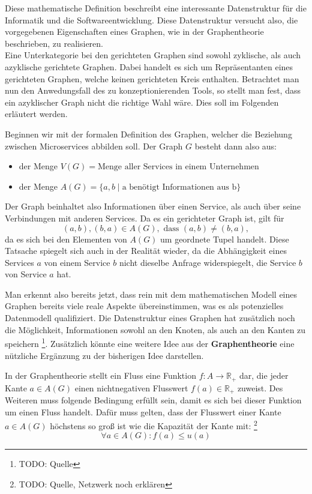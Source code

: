 Diese mathematische Definition beschreibt eine interessante Datenstruktur für die Informatik und die Softwareentwicklung. Diese Datenstruktur versucht also, die vorgegebenen Eigenschaften eines Graphen, wie in der Graphentheorie beschrieben, zu realisieren. \\
Eine Unterkategorie bei den gerichteten Graphen sind sowohl zyklische, als auch azyklische gerichtete Graphen. Dabei handelt es sich um Repräsentanten eines gerichteten Graphen, welche keinen gerichteten Kreis enthalten. Betrachtet man nun den Anwedungsfall des zu konzeptionierenden Tools, so stellt man fest, dass ein azyklischer Graph nicht die richtige Wahl wäre. Dies soll im Folgenden erläutert werden.

\begin{example}
	Beginnen wir mit der formalen Definition des Graphen, welcher die Beziehung zwischen Microservices abbilden soll. Der Graph $G$ besteht dann also aus: 
	\begin{itemize}
		\item der Menge $V(G)=\text{Menge aller Services in einem Unternehmen}$
		\item der Menge $A(G)=\{a,b \mid \text{a benötigt Informationen aus b}\}$
	\end{itemize}
	Der Graph beinhaltet also Informationen über einen Service, als auch über seine Verbindungen mit anderen Services. Da es ein gerichteter Graph ist, gilt für $$(a,b), (b,a) \in A(G),\text{ dass }(a,b) \neq (b,a),$$ da es sich bei den Elementen von $A(G)$ um geordnete Tupel handelt. Diese Tatsache spiegelt sich auch in der Realität wieder, da die Abhängigkeit eines Services $a$ von einem Service $b$ nicht dieselbe Anfrage widerspiegelt, die Service $b$ von Service $a$ hat.
\end{example}\label{exp:microserviceGraph}

Man erkennt also bereits jetzt, dass rein mit dem mathematischen Modell eines Graphen bereits viele reale Aspekte übereinstimmen, was es als potenzielles Datenmodell qualifiziert. Die Datenstruktur eines Graphen hat zusätzlich noch die Möglichkeit, Informationen sowohl an den Knoten, als auch an den Kanten zu speichern \footnote{TODO: Quelle}. Zusätzlich könnte eine weitere Idee aus der \textbf{Graphentheorie} eine nützliche Ergänzung zu der bisherigen Idee darstellen.

\begin{definition}[Fluss]\label{def:Fluss}
	In der Graphentheorie stellt ein Fluss eine Funktion $f: A \rightarrow \mathbb{R_+}$ dar, die jeder Kante $a \in A(G)$ einen nichtnegativen Flusswert $f(a) \in \mathbb{R_+}$ zuweist. Des Weiteren muss folgende Bedingung erfüllt sein, damit es sich bei dieser Funktion um einen Fluss handelt. Dafür muss gelten, dass der Flusswert einer Kante $a \in A(G)$ höchstens so groß ist wie die Kapazität der Kante mit: \footnote{TODO: Quelle, Netzwerk noch erklären} $$\forall a \in A(G): f(a) \leq u(a)$$
\end{definition}

